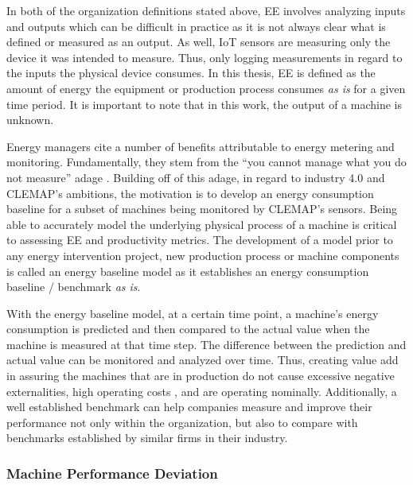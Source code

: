 In both of the organization definitions stated above, EE involves analyzing inputs and outputs which can be difficult in practice as it is not always clear what is defined or measured as an output. As well, IoT sensors are measuring only the device it was intended to measure. Thus, only logging measurements in regard to the inputs the physical device consumes. In this thesis, EE is defined as the amount of energy the equipment or production process consumes \textit{as is} for a given time period. It is important to note that in this work, the output of a machine is unknown.  

Energy managers cite a number of benefits attributable to energy metering and monitoring. Fundamentally, they stem from the “you cannot manage what you do not measure” adage \cite{3M}. Building off of this adage, in regard to industry 4.0 and CLEMAP's ambitions, the motivation is to develop an energy consumption baseline for a subset of machines being monitored by CLEMAP's sensors. Being able to accurately model the underlying physical process of a machine is critical to assessing EE and productivity metrics. The development of a model prior to any energy intervention project, new production process or machine components is called an energy baseline model as it establishes an energy consumption baseline / benchmark \textit{as is}. 

With the energy baseline model, at a certain time point, a machine's energy consumption is predicted and then compared to the actual value when the machine is measured at that time step. The difference between the prediction and actual value can be monitored and analyzed over time. Thus, creating value add in assuring the machines that are in production do not cause excessive negative externalities, high operating costs \cite{eea}, and are operating nominally. Additionally, a well established benchmark can help companies measure and improve their performance not only within the organization, but also to compare with benchmarks established by similar firms in their industry.

\subsubsection{Machine Performance Deviation}

